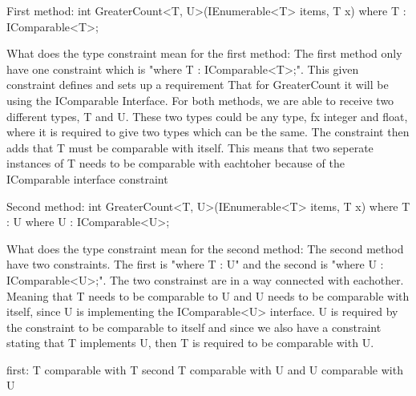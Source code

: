 First method:
int GreaterCount<T, U>(IEnumerable<T> items, T x)
    where T : IComparable<T>;

What does the type constraint mean for the first method:
The first method only have one constraint which is "where T : IComparable<T>;". This given constraint defines and sets up a requirement
That for GreaterCount it will be using the IComparable Interface. For both methods, we are able to receive two different types, T and U.
These two types could be any type, fx integer and float, where it is required to give two types which can be the same. 
The constraint then adds that T must be comparable with itself. 
This means that two seperate instances of T needs to be comparable with eachtoher because of the IComparable interface constraint

Second method:
int GreaterCount<T, U>(IEnumerable<T> items, T x)
    where T : U
    where U : IComparable<U>;

What does the type constraint mean for the second method:
The second method have two constraints. The first is "where T : U" and the second is "where U : IComparable<U>;".
The two constrainst are in a way connected with eachother. Meaning that T needs to be comparable to U and U needs to 
be comparable with itself, since U is implementing the IComparable<U> interface.
U is required by the constraint to be comparable to itself and since we also have a constraint stating that T implements U, then
T is required to be comparable with U.

first:
T comparable with T
second
T comparable with U and U comparable with U